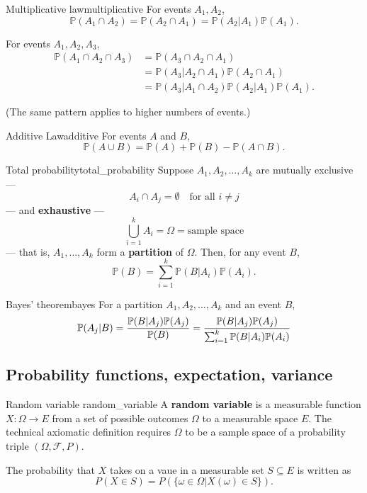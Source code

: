 \begin{theorem}{Multiplicative law}{multiplicative}
For events $A_1, A_2$,
$$ \mathbb{P} (A_1 \cap A_2) = \mathbb{P} (A_2 \cap A_1) = \mathbb{P} (A_2 \vert A_1) \mathbb{P} (A_1) . $$

For events $A_1, A_2, A_3$,
\begin{align*}
\mathbb{P} (A_1 \cap A_2 \cap A_3)
&= \mathbb{P} (A_3 \cap A_2 \cap A_1) \\
&= \mathbb{P} (A_3 \vert A_2 \cap A_1) \mathbb{P} (A_2 \cap A_1) \\
&= \mathbb{P} (A_3 \vert A_1 \cap A_2) \mathbb{P} (A_2 \vert A_1) \mathbb{P} (A_1) .
\end{align*}

(The same pattern applies to higher numbers of events.)
\end{theorem}

\begin{theorem}{Additive Law}{additive}
For events $A$ and $B$,
$$ \mathbb{P} (A \cup B) = \mathbb{P}(A) + \mathbb{P}(B) - \mathbb{P}(A \cap B) . $$
\end{theorem}

\begin{theorem}{Total probability}{total_probability}
Suppose $A_1, A_2, \ldots, A_k$ are mutually exclusive ---
$$ A_i \cap A_j = \emptyset \quad \text{for all } i \not = j $$
--- and \textbf{exhaustive} ---
$$ \bigcup_{i = 1}^k A_i = \Omega = \text{sample space} $$
--- that is, $A_1, \ldots, A_k$ form a \textbf{partition} of $\Omega$. Then, for any event $B$,
$$ \mathbb{P}(B) = \sum_{i=1}^k \mathbb{P}(B \vert A_i) \mathbb{P}(A_i) . $$
\end{theorem}

\begin{theorem}{Bayes' theorem}{bayes}
For a partition $A_1, A_2, \ldots, A_k$ and an event $B$,
$$
\mathbb{P}(A_j \vert B) 
= \dfrac{\mathbb{P}(B \vert A_j) \mathbb{P}(A_j)}{\mathbb{P}(B)} \\
= \dfrac{\mathbb{P}(B \vert A_j) \mathbb{P}(A_j)}{\sum_{i=1}^k \mathbb{P}(B|A_i) \mathbb{P}(A_i)}
$$
\end{theorem}

\subsection{Probability functions, expectation, variance}

\begin{definition}{Random variable \cite{wikipedia_random_variable}}{random_variable}
	A \textbf{random variable} is a measurable function $X : \Omega \to E$ from a set of possible outcomes $\Omega$ to a measurable space $E$. The technical axiomatic definition requires $\Omega$ to be a sample space of a probability triple $(\Omega, \mathcal{F}, P)$.

	The probability that $X$ takes on a vaue in a measurable set $S \subseteq E$ is written as
	$$ P(X \in S) = P(\{ \omega \in \Omega \vert X(\omega) \in S \}) . $$
\end{definition}

